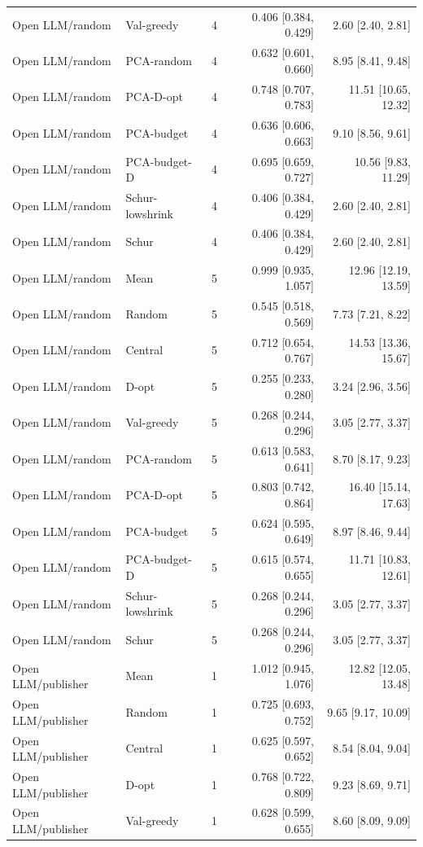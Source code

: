 \begin{longtable}{lllrr}
Open LLM/random & Val-greedy & 4 & 0.406 [0.384, 0.429] & 2.60 [2.40, 2.81]\\
Open LLM/random & PCA-random & 4 & 0.632 [0.601, 0.660] & 8.95 [8.41, 9.48]\\
Open LLM/random & PCA-D-opt & 4 & 0.748 [0.707, 0.783] & 11.51 [10.65, 12.32]\\
Open LLM/random & PCA-budget & 4 & 0.636 [0.606, 0.663] & 9.10 [8.56, 9.61]\\
Open LLM/random & PCA-budget-D & 4 & 0.695 [0.659, 0.727] & 10.56 [9.83, 11.29]\\
Open LLM/random & Schur-lowshrink & 4 & 0.406 [0.384, 0.429] & 2.60 [2.40, 2.81]\\
Open LLM/random & Schur & 4 & 0.406 [0.384, 0.429] & 2.60 [2.40, 2.81]\\
Open LLM/random & Mean & 5 & 0.999 [0.935, 1.057] & 12.96 [12.19, 13.59]\\
Open LLM/random & Random & 5 & 0.545 [0.518, 0.569] & 7.73 [7.21, 8.22]\\
Open LLM/random & Central & 5 & 0.712 [0.654, 0.767] & 14.53 [13.36, 15.67]\\
Open LLM/random & D-opt & 5 & 0.255 [0.233, 0.280] & 3.24 [2.96, 3.56]\\
Open LLM/random & Val-greedy & 5 & 0.268 [0.244, 0.296] & 3.05 [2.77, 3.37]\\
Open LLM/random & PCA-random & 5 & 0.613 [0.583, 0.641] & 8.70 [8.17, 9.23]\\
Open LLM/random & PCA-D-opt & 5 & 0.803 [0.742, 0.864] & 16.40 [15.14, 17.63]\\
Open LLM/random & PCA-budget & 5 & 0.624 [0.595, 0.649] & 8.97 [8.46, 9.44]\\
Open LLM/random & PCA-budget-D & 5 & 0.615 [0.574, 0.655] & 11.71 [10.83, 12.61]\\
Open LLM/random & Schur-lowshrink & 5 & 0.268 [0.244, 0.296] & 3.05 [2.77, 3.37]\\
Open LLM/random & Schur & 5 & 0.268 [0.244, 0.296] & 3.05 [2.77, 3.37]\\
Open LLM/publisher & Mean & 1 & 1.012 [0.945, 1.076] & 12.82 [12.05, 13.48]\\
Open LLM/publisher & Random & 1 & 0.725 [0.693, 0.752] & 9.65 [9.17, 10.09]\\
Open LLM/publisher & Central & 1 & 0.625 [0.597, 0.652] & 8.54 [8.04, 9.04]\\
Open LLM/publisher & D-opt & 1 & 0.768 [0.722, 0.809] & 9.23 [8.69, 9.71]\\
Open LLM/publisher & Val-greedy & 1 & 0.628 [0.599, 0.655] & 8.60 [8.09, 9.09]\\

\end{longtable}
